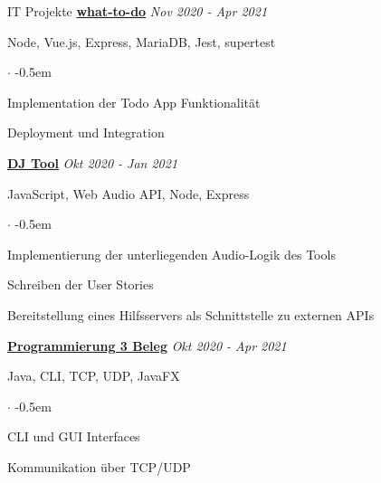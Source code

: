 \documentclass{cv}
\begin{document}
\begin{rSection}{IT Projekte}
  \textbf{\href{https://github.com/jneidel/what-to-do}{what-to-do}}
  \hfill
  {\em Nov 2020 - Apr 2021}

  Node, Vue.js, Express, MariaDB, Jest, supertest

  \begin{list}{$\cdot$}{}
    \itemsep -0.5em \vspace{-0.5em} %
    \smallskip
    \item Implementation der Todo App Funktionalität
    \item Deployment und Integration
  \end{list}

  \textbf{\href{https://github.com/vyvytn/avt}{DJ Tool}}
  \hfill
  {\em Okt 2020 - Jan 2021}

  JavaScript, Web Audio API, Node, Express
  \begin{list}{$\cdot$}{}
    \itemsep -0.5em \vspace{-0.5em}
    \smallskip
    \item Implementierung der unterliegenden Audio-Logik des Tools
    \item Schreiben der User Stories
    \item Bereitstellung eines Hilfsservers als Schnittstelle zu externen APIs
  \end{list}

  \textbf{\href{https://github.com/jneidel/htw-prog3}{Programmierung 3 Beleg}}
  \hfill
  {\em Okt 2020 - Apr 2021}

  Java, CLI, TCP, UDP, JavaFX
  \begin{list}{$\cdot$}{}
    \itemsep -0.5em \vspace{-0.5em}
    \smallskip
    \item CLI und GUI Interfaces
    \item Kommunikation über TCP/UDP
  \end{list}




\end{rSection}
\end{document}
